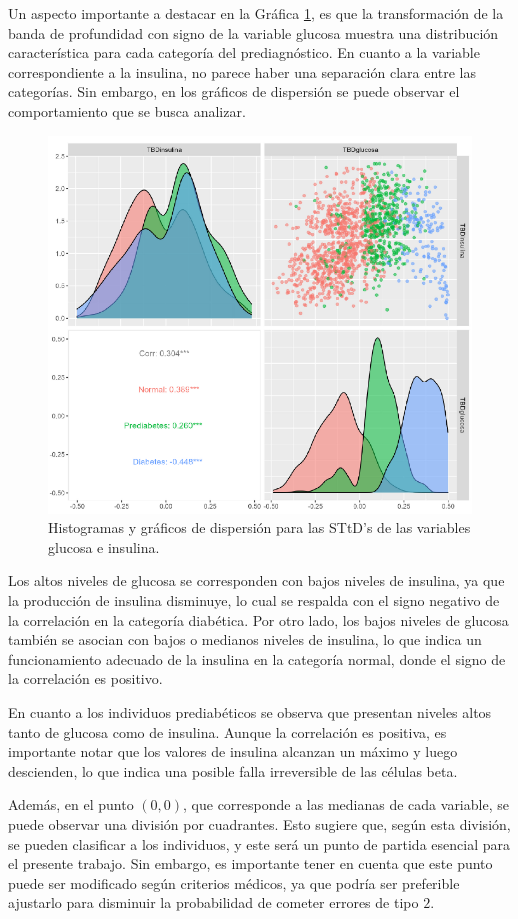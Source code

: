 Un aspecto importante a destacar en la Gráfica \ref{fig:pairsTBD}, es que la transformación de la banda de profundidad con signo de la variable glucosa muestra una distribución característica para cada categoría del prediagnóstico. En cuanto a la variable correspondiente a la insulina, no parece haber una separación clara entre las categorías. Sin embargo, en los gráficos de dispersión se puede observar el comportamiento que se busca analizar.

\begin{figure}[H]
    \centering
    \includegraphics[width = 0.7 \textwidth]{Imagenes/pairsTBDS.png}
    \caption{Histogramas y gráficos de dispersión para las STtD's de las variables glucosa e insulina.}
    \label{fig:pairsTBD}
\end{figure}


Los altos niveles de glucosa se corresponden con bajos niveles de insulina, ya que la producción de insulina disminuye, lo cual se respalda con el signo negativo de la correlación en la categoría diabética. Por otro lado, los bajos niveles de glucosa también se asocian con bajos o medianos niveles de insulina, lo que indica un funcionamiento adecuado de la insulina en la categoría normal, donde el signo de la correlación es positivo.

En cuanto a los individuos prediabéticos se observa que presentan niveles altos tanto de glucosa como de insulina. Aunque la correlación es positiva, es importante notar que los valores de insulina alcanzan un máximo y luego descienden, lo que indica una posible falla irreversible de las células beta.

Además, en el punto $(0, 0)$, que corresponde a las medianas de cada variable, se puede observar una división por cuadrantes. Esto sugiere que, según esta división, se pueden clasificar a los individuos, y este será un punto de partida esencial para el presente trabajo. Sin embargo, es importante tener en cuenta que este punto puede ser modificado según criterios médicos, ya que podría ser preferible ajustarlo para disminuir la probabilidad de cometer errores de tipo $2$.

